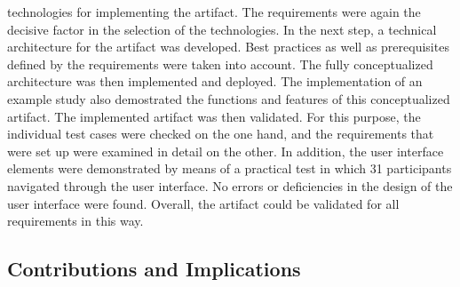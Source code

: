 technologies for implementing the artifact. The requirements were again the decisive factor in the selection of the technologies. In the next step, a technical architecture for the artifact was developed. Best practices as well as prerequisites defined by the requirements were taken into account. The fully conceptualized architecture was then implemented and deployed. The implementation of an example study also demostrated the functions and features of this conceptualized artifact. The implemented artifact was then validated. For this purpose, the individual test cases were checked on the one hand, and the requirements that were set up were examined in detail on the other. In addition, the user interface elements were demonstrated by means of a practical test in which 31 participants navigated through the user interface. No errors or deficiencies in the design of the user interface were found. Overall, the artifact could be validated for all requirements in this way.

\subsection{Contributions and Implications}

